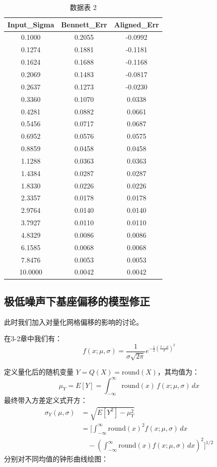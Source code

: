 \documentclass[journal]{IEEEtran}
\begin{document}
\begin{table}[htbp]
\centering
\caption{数据表 2}
\label{tab:data-2}
\begin{tabular}{ccc}
\toprule
Input\_Sigma & Bennett\_Err & Aligned\_Err \\
\midrule
0.1000 & 0.2055 & -0.0992 \\
0.1274 & 0.1881 & -0.1181 \\
0.1624 & 0.1688 & -0.1168 \\
0.2069 & 0.1483 & -0.0817 \\
0.2637 & 0.1273 & -0.0230 \\
0.3360 & 0.1070 & 0.0338 \\
0.4281 & 0.0882 & 0.0661 \\
0.5456 & 0.0717 & 0.0687 \\
0.6952 & 0.0576 & 0.0575 \\
0.8859 & 0.0458 & 0.0458 \\
1.1288 & 0.0363 & 0.0363 \\
1.4384 & 0.0287 & 0.0287 \\
1.8330 & 0.0226 & 0.0226 \\
2.3357 & 0.0178 & 0.0178 \\
2.9764 & 0.0140 & 0.0140 \\
3.7927 & 0.0110 & 0.0110 \\
4.8329 & 0.0086 & 0.0086 \\
6.1585 & 0.0068 & 0.0068 \\
7.8476 & 0.0053 & 0.0053 \\
10.0000 & 0.0042 & 0.0042 \\
\bottomrule
\end{tabular}
\end{table}


\subsection{极低噪声下基座偏移的模型修正}


此时我们加入对量化网格偏移的影响的讨论。

在3-2章中我们有：
\[
f(x; \mu, \sigma) = \frac{1}{\sigma\sqrt{2\pi}} e^{-\frac{1}{2}\left(\frac{x-\mu}{\sigma}\right)^2}
\]

定义量化后的随机变量 $Y = Q(X) = \text{round}(X)$，其均值为：
\[
\mu_Y = E[Y] = \int_{-\infty}^{\infty} \text{round}(x)\, f(x; \mu, \sigma)\, dx
\]
最终带入方差定义式开方：
\[
\begin{aligned}
\sigma_Y(\mu, \sigma)
&= \sqrt{E[Y^2] - \mu_Y^2} \\
&= \Bigg[ \int_{-\infty}^{\infty} \text{round}(x)^2 f(x; \mu, \sigma)\, dx \\
&\quad - \left( \int_{-\infty}^{\infty} \text{round}(x) f(x; \mu, \sigma)\, dx \right)^2 \Bigg]^{1/2}
\end{aligned}
\]
分别对不同均值的钟形曲线绘图：
\end{document}
